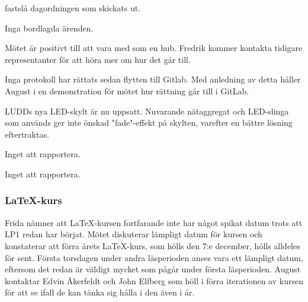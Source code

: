 \documentclass{protokoll}
\begin{document}
\newpage  


\begin{beslut}
     \att fastslå dagordningen som skickats ut.
\end{beslut}

Inga bordlagda ärenden.

Mötet är positivt till att vara med som en hub. Fredrik kommer kontakta tidigare representanter för att höra mer om hur det går till.

Inga protokoll har rättats sedan flytten till Gitlab. Med anledning av detta håller August i en demonstration för mötet hur rättning går till i GitLab. 

LUDDs nya LED-skylt är nu uppsatt. Nuvarande nätaggregat och LED-slinga som används ger inte önskad "fade"-effekt på skylten, varefter en bättre lösning eftertraktas. %

Inget att rapportera. 

Inget att rapportera. 

\subsubsection{LaTeX-kurs}
Frida nämner att LaTeX-kursen fortfarande inte har något spikat datum trots att LP1 redan har börjat. Mötet diskuterar lämpligt datum för kursen och konstaterar att förra årets LaTeX-kurs, som hölls den 7:e december, hölls alldeles för sent. 
Första torsdagen under andra läsperioden anses vara ett lämpligt datum, eftersom det redan är väldigt mycket som pågår under första läsperioden. 
August kontaktar Edvin Åkerfeldt och John Elfberg som höll i förra iterationen av kursen för att se ifall de kan tänka sig hålla i den även i år. 
\end{document}
